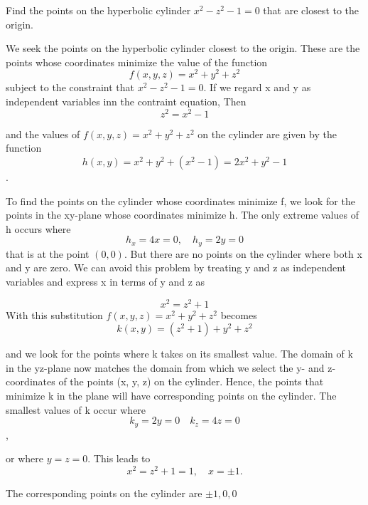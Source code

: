 \documentclass[12pt,a4paper,draft]{article}
\begin{document}
\begin{example}
    Find the points on the hyperbolic cylinder \(x^2 - z^2 -1 = 0\) that are closest to the origin.

    \begin{solution}
        We seek the points on the hyperbolic cylinder closest to the origin. These are the points whose coordinates minimize the value of the function
        \[f(x,y,z) = x^2 + y^2 + z^2\]
        subject to the constraint that \(x^2 - z^2 -1 = 0\). If we regard x and y as independent variables inn the contraint equation, Then
        \[z^2 = x^2 -1\]

        and the values of \(f(x,y,z) = x^2 + y^2 + z^2 \) on the cylinder are given by the function
         \[h(x,y) = x^2 + y^2 + (x^2 -1) = 2x^2 + y^2 -1\].

         To find the points on the cylinder whose coordinates minimize f, we look for the points in the xy-plane whose coordinates minimize h. The only extreme values of h occurs where
         \[h_x = 4x = 0, \quad h_y = 2y = 0\]
         that is at the point \((0,0)\). But there are no points on the cylinder where both x and y are zero. We can avoid this problem by treating y  and z as independent variables and express x in terms of y and z as

          \[x^2 = z^2 +1\]
          With this substitution \(f(x,y,z) = x^2 + y^2 + z^2 \) becomes 
          \[k(x,y) = (z^2 +1) + y^2 + z^2 \]

          and we look for the points where k takes on its smallest value. The domain of k in the yz-plane now matches the domain from which we select the y- and z-coordinates of the points (x, y, z) on the cylinder. Hence, the points that minimize k in the plane will have corresponding points on the cylinder. The smallest values of k occur where
          \[k_y = 2y = 0 \quad k_z = 4z = 0\],

          or where \(y = z = 0\). This leads to 
          \[x^2 = z^2 +1 = 1, \quad x = \pm 1.\]

          The corresponding points on the cylinder are \(\pm 1, 0, 0\)


\end{solution}
\end{example}
\end{document}
